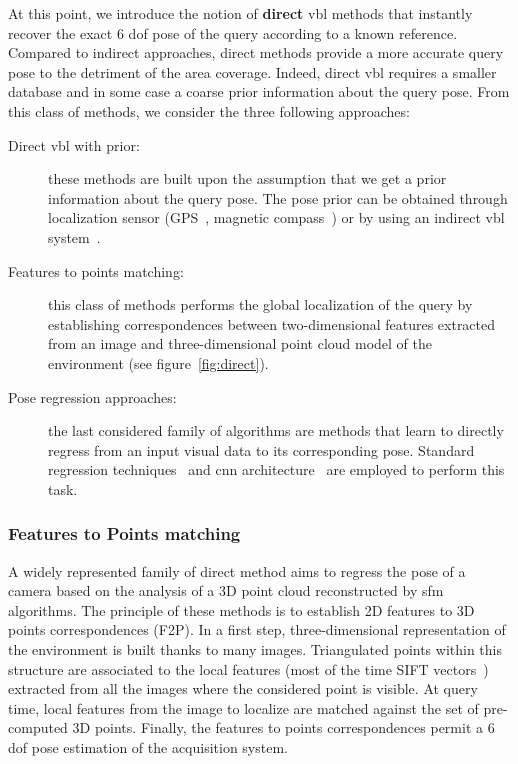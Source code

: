 At this point, we introduce the notion of \textbf{direct} \ac{vbl} methods that instantly recover the exact 6 \ac{dof} pose of the query according to a known reference. Compared to indirect approaches, direct methods provide a more accurate query pose to the detriment of the area coverage. Indeed, direct \ac{vbl} requires a smaller database and in some case a coarse prior information about the query pose. From this class of methods, we consider the three following approaches:
\begin{description}
	\item[Direct \ac{vbl} with prior:] these methods are built upon the assumption that we get a prior information about the query pose. The pose prior can be obtained through localization sensor (GPS~\citep{Chen2011,Arth2015,Poglitsch2015}, magnetic compass~\citep{Svarm2014,Zeisl2015,Svarm2016}) or by using an indirect \ac{vbl} system~\citep{Torii2011,Song2016,Sattler2017}.
	\item[Features to points matching:] this class of methods performs the global localization of the query by establishing correspondences between two-dimensional features extracted from an image and three-dimensional point cloud model of the environment (see figure~\ref{fig:direct}).
	\item[Pose regression approaches:] the last considered family of algorithms are methods that learn to directly regress from an input visual data to its corresponding pose. Standard regression techniques~\citep{Shotton2013} and \ac{cnn} architecture~\citep{Kendall2015} are employed to perform this task.
\end{description}

\subsubsection{Features to Points matching}
\label{subsubsec:sfm_methods}						
A widely represented family of direct method aims to regress the pose of a camera based on the analysis of a 3D point cloud reconstructed by \ac{sfm} algorithms. The principle of these methods is to establish 2D features to 3D points correspondences (F2P). In a first step, three-dimensional representation of the environment is built thanks to many images. Triangulated points within this structure are associated to the local features (most of the time SIFT vectors~\citep{Lowe2004}) extracted from all the images where the considered point is visible. At query time, local features from the image to localize are matched against the set of pre-computed 3D points. Finally, the features to points correspondences permit a 6 \ac{dof} pose estimation of the acquisition system.

